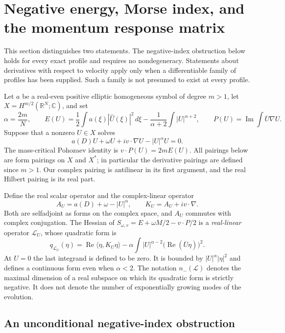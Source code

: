 \section{Negative energy, Morse index, and the momentum response matrix}
\label{sec:r10-inertia}

This section distinguishes two statements.  The negative-index obstruction
below holds for every exact profile and requires no nondegeneracy.  Statements
about derivatives with respect to velocity apply only when a differentiable
family of profiles has been supplied.  Such a family is not presumed to exist
at every profile.

Let $a$ be a real-even positive elliptic homogeneous symbol of degree $m>1$,
let $X=H^{m/2}(\mathbb R^N;\mathbb C)$, and set
\[
 \alpha=\frac{2m}{N},\qquad
 E(U)=\frac12\int a(\xi)|\widehat U(\xi)|^2\,d\xi
       -\frac1{\alpha+2}\int|U|^{\alpha+2},\qquad
 P(U)=\operatorname{Im}\int\overline U\nabla U.
\]
Suppose that a nonzero $U\in X$ solves
\begin{equation}\label{eq:r10-profile}
 a(D)U+\omega U+i v\cdot\nabla U-|U|^\alpha U=0.
\end{equation}
The mass-critical Pohozaev identity is $v\cdot P(U)=2mE(U)$.
All pairings below are form pairings on $X$ and $X^*$; in particular
the derivative pairings are defined since $m>1$.
Our complex pairing is antilinear in its first argument, and the real
Hilbert pairing is its real part.

Define the real scalar operator and the complex-linear operator
\[
 A_U=a(D)+\omega-|U|^\alpha,\qquad
 K_U=A_U+i v\cdot\nabla.
\]
Both are selfadjoint as forms on the complex space, and $A_U$ commutes
with complex conjugation.  The Hessian of
$S_{\omega,v}=E+\omega M/2-v\cdot P/2$ is a \emph{real-linear} operator
$\mathcal L_U$, whose quadratic form is
\begin{equation}\label{eq:r10-fullhessian}
 q_{\mathcal L_U}(\eta)
 =\operatorname{Re}\langle\eta,K_U\eta\rangle
 -\alpha\int |U|^{\alpha-2}
       \bigl(\operatorname{Re}(\overline U\eta)\bigr)^2.
\end{equation}
At $U=0$ the last integrand is defined to be zero.  It is bounded by
$|U|^\alpha|\eta|^2$ and defines a continuous form even when $\alpha<2$.
The notation $n_-(\mathcal L)$ denotes the maximal dimension of a real
subspace on which its quadratic form is strictly negative.  It does not
denote the number of exponentially growing modes of the evolution.

\subsection{An unconditional negative-index obstruction}

